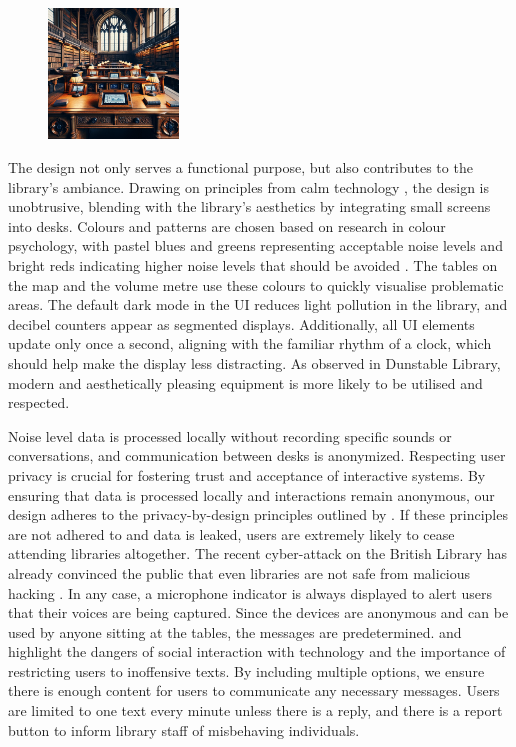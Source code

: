 \documentclass{novel}
\begin{document}
\begin{figure}
\vspace{-\intextsep}
    \includegraphics[width=0.31\textwidth]{resources/deskDevice.jpg}
    \vspace{-20pt} %
\end{figure}
The design not only serves a functional purpose, but also contributes to the library's ambiance. Drawing on principles from calm technology \citep{denning_coming_1997}, the design is unobtrusive, blending with the library's aesthetics by integrating small screens into desks. Colours and patterns are chosen based on research in colour psychology, with pastel blues and greens representing acceptable noise levels and bright reds indicating higher noise levels that should be avoided \citep{elliot_color_2007}. The tables on the map and the volume metre use these colours to quickly visualise problematic areas. The default dark mode in the UI reduces light pollution in the library, and decibel counters appear as segmented displays. Additionally, all UI elements update only once a second, aligning with the familiar rhythm of a clock, which should help make the display less distracting. As observed in Dunstable Library, modern and aesthetically pleasing equipment is more likely to be utilised and respected. 

Noise level data is processed locally without recording specific sounds or conversations, and communication between desks is anonymized. Respecting user privacy is crucial for fostering trust and acceptance of interactive systems. By ensuring that data is processed locally and interactions remain anonymous, our design adheres to the privacy-by-design principles outlined by \cite{cavoukian_privacy_2010}. If these principles are not adhered to and data is leaked, users are extremely likely to cease attending libraries altogether. The recent cyber-attack on the British Library has already convinced the public that even libraries are not safe from malicious hacking \citep{sir_roly_keating_learning_2024}. In any case, a microphone indicator is always displayed to alert users that their voices are being captured. Since the devices are anonymous and can be used by anyone sitting at the tables, the messages are predetermined. \cite{kraut_internet_2002} and \cite{joinson_self-esteem_2004} highlight the dangers of social interaction with technology and the importance of restricting users to inoffensive texts. By including multiple options, we ensure there is enough content for users to communicate any necessary messages. Users are limited to one text every minute unless there is a reply, and there is a report button to inform library staff of misbehaving individuals.
\end{document}
